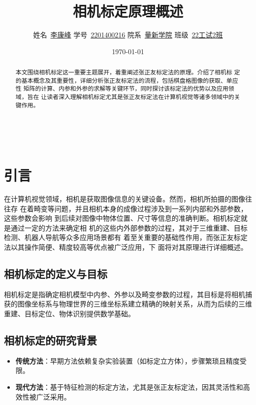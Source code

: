 \documentclass[hyperref,a4paper,UTF8]{ctexart}
\title{\textbf{{相机标定原理概述}}}
\author{
\kaishu\normalsize
姓名\ \underline{李康峰} \qquad
学号\ \underline{2201400216} \qquad
院系\ \underline{量新学院} \qquad
班级\ \underline{22工试2班} 
}
\date{\today} %
\begin{document}
\maketitle

\begin{abstract}

本文围绕相机标定这一重要主题展开，着重阐述张正友标定法的原理。介绍了相机标
定的基本概念及其重要性，详细分析张正友标定法的流程，包括棋盘格图像的获取、单应性
矩阵的计算、内参和外参的求解等关键环节，同时探讨该标定法的优势以及应用领域，旨在
让读者深入理解相机标定尤其是张正友标定法在计算机视觉等诸多领域中的关键作用。

\end{abstract}

\

\tableofcontents

\thispagestyle{empty} %
\newpage

\section{引言}

在计算机视觉领域，相机是获取图像信息的关键设备。然而，相机所拍摄的图像往往存
在着畸变等问题，并且相机本身的成像过程涉及到一系列内部和外部参数，这些参数会影响
到后续对图像中物体位置、尺寸等信息的准确判断。相机标定就是通过一定的方法来确定相
机的这些内外部参数的过程，其对于三维重建、目标检测、机器人导航等众多应用场景都有
着至关重要的基础性作用，而张正友标定法以其操作简便、精度较高等优点被广泛应用，下
面将对其原理进行详细概述。

\subsection{相机标定的定义与目标}

相机标定是指确定相机模型中内参、外参以及畸变参数的过程，其目标是将相机捕获的图像坐标系与物理世界的三维坐标系建立精确的映射关系，从而为后续的三维重建、目标定位、物体识别提供数学基础\citep{zhang1998calibration,hartley2004multiple}。

\subsection{相机标定的研究背景}

\begin{itemize}
    \item \textbf{传统方法}：早期方法依赖复杂实验装置（如标定立方体），步骤繁琐且精度受限。
    \item \textbf{现代方法}：基于特征检测的标定方法，尤其是张正友标定法，因其灵活性和高效性被广泛采用。
\end{itemize}
\end{document}
